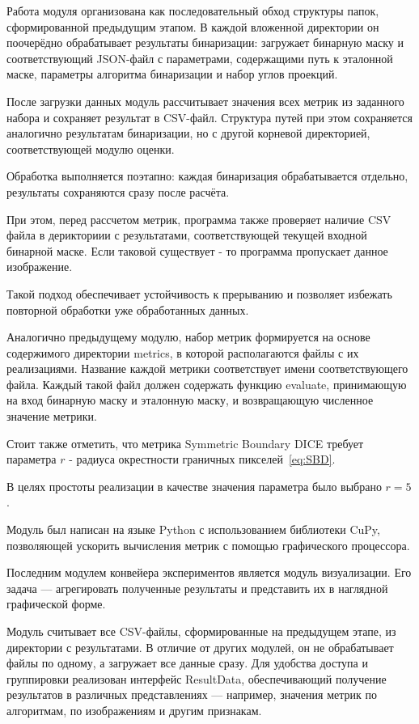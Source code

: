 Работа модуля организована как последовательный обход структуры папок, сформированной предыдущим этапом. В каждой вложенной директории он поочерёдно обрабатывает результаты бинаризации: загружает бинарную маску и соответствующий JSON-файл с параметрами, содержащими путь к эталонной маске, параметры алгоритма бинаризации и набор углов проекций.

После загрузки данных модуль рассчитывает значения всех метрик из заданного набора и сохраняет результат в CSV-файл. Структура путей при этом сохраняется аналогично результатам бинаризации, но с другой корневой директорией, соответствующей модулю оценки.

Обработка выполняется поэтапно: каждая бинаризация обрабатывается отдельно, результаты сохраняются сразу после расчёта. 

При этом, перед рассчетом метрик, программа также проверяет наличие CSV файла в дерикториии с результатами, соответствующей текущей входной бинарной маске. Если таковой существует - то программа пропускает данное изображение.

Такой подход обеспечивает устойчивость к прерыванию и позволяет избежать повторной обработки уже обработанных данных.

Аналогично предыдущему модулю, набор метрик формируется на основе содержимого директории metrics, в которой располагаются файлы с их реализациями. Название каждой метрики соответствует имени соответствующего файла. Каждый такой файл должен содержать функцию evaluate, принимающую на вход бинарную маску и эталонную маску, и возвращающую численное значение метрики.

Стоит также отметить, что метрика Symmetric Boundary DICE требует параметра \(r\) - радиуса окрестности граничных пикселей~\eqref{eq:SBD}.

В целях простоты реализации в качестве значения параметра было выбрано \(r = 5\). 

Модуль был написан на языке Python с использованием библиотеки CuPy, позволяющей ускорить вычисления метрик с помощью графического процессора.

Последним модулем конвейера экспериментов является модуль визуализации. Его задача — агрегировать полученные результаты и представить их в наглядной графической форме.

Модуль считывает все CSV-файлы, сформированные на предыдущем этапе, из директории с результатами. В отличие от других модулей, он не обрабатывает файлы по одному, а загружает все данные сразу. Для удобства доступа и группировки реализован интерфейс ResultData, обеспечивающий получение результатов в различных представлениях — например, значения метрик по алгоритмам, по изображениям и другим признакам.

